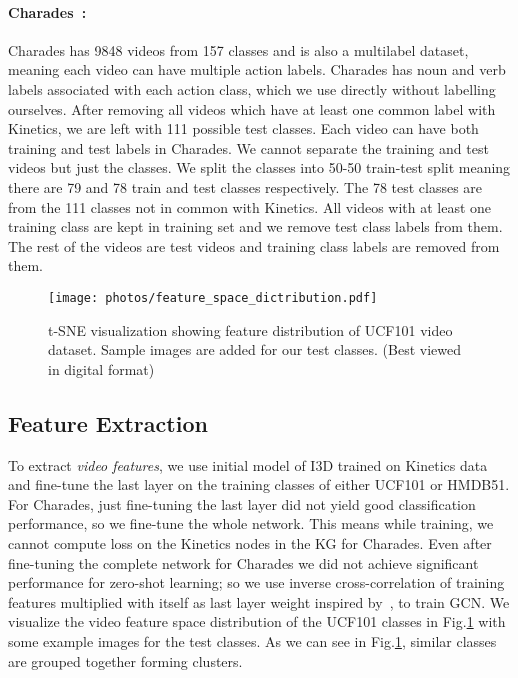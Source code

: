 \paragraph{\bf{Charades}~\cite{charades2016}:} Charades has 9848 videos from 157 classes and is also a multilabel dataset, meaning each video can have multiple action labels. Charades has noun and verb labels associated with each action class, which we use directly without labelling ourselves. After removing all videos which have at least one common label with Kinetics, we are left with 111 possible test classes. Each video can have both training and test labels in Charades. We cannot separate the training and test videos but just the classes. We split the classes into 50-50 train-test split meaning there are 79 and 78 train and test classes respectively. The 78 test classes are from the 111 classes not in common with Kinetics. All videos with at least one training class are kept in training set and we remove test class labels from them. The rest of the videos are test videos and training class labels are removed from them.

\begin{figure}
\centering
 \texttt{[image: photos/feature\_space\_dictribution.pdf]}
\caption{t-SNE visualization showing feature distribution of UCF101 video dataset. Sample images are added for our test classes. (Best viewed in digital format)}
\label{fig:tsne_feat}
\end{figure}


\subsection{Feature Extraction} 

\label{feat_extract} 

To extract \emph{video features}, we use initial model of I3D trained on Kinetics data and fine-tune the last layer on the training classes of either UCF101 or HMDB51. For Charades, just fine-tuning the last layer did not yield good classification performance, so we fine-tune the whole network. This means while training, we cannot compute loss on the Kinetics nodes in the KG for Charades. Even after fine-tuning the complete network for Charades we did not achieve significant performance for zero-shot learning; so we use inverse cross-correlation of training features multiplied with itself as last layer weight inspired by~\cite{romera2015embarrassingly}, to train GCN. We visualize the video feature space distribution of the UCF101 classes in Fig.\ref{fig:tsne_feat} with some example images for the test classes. As we can see in Fig.\ref{fig:tsne_feat}, similar classes are grouped together forming clusters.

